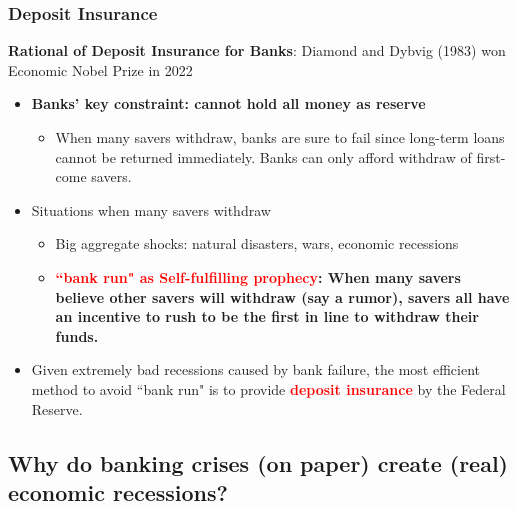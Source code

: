 \documentclass[aspectratio=169]{beamer}
\begin{document}
\begin{frame}
\frametitle{Deposit Insurance}

\textbf{Rational of Deposit Insurance for Banks}: Diamond and Dybvig (1983) won Economic Nobel Prize in 2022
\medskip 
\begin{itemize}
    \item \textbf{Banks' key constraint: cannot hold all money as reserve}
    \begin{itemize}
        \item When many savers withdraw, banks are sure to fail since long-term loans cannot be returned immediately. Banks can only afford withdraw of first-come savers. 
    \end{itemize}
    \medskip 
    \item Situations when many savers withdraw
    \begin{itemize}
        \item Big aggregate shocks: natural disasters, wars, economic recessions
        \item \textbf{\textcolor{red}{``bank run" as Self-fulfilling prophecy}: When many savers believe other savers will withdraw (say a rumor), savers all have an incentive to rush to be the first in line to withdraw their funds.}
    \end{itemize}
    \medskip 
    \item Given extremely bad recessions caused by bank failure, the most efficient method to avoid ``bank run" is to provide \textbf{\textcolor{red}{deposit insurance}} by the Federal Reserve. 
\end{itemize}
\end{frame}

\subsection{Why do banking crises (on paper) create (real) economic recessions?}
\end{document}
